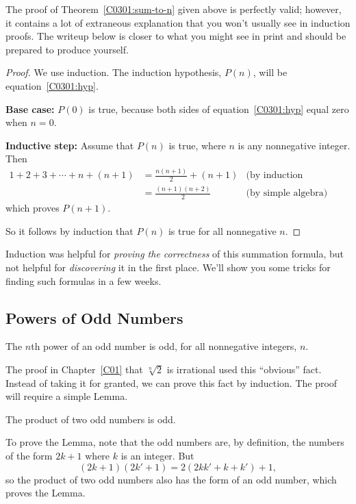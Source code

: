 The proof of Theorem~\ref{C0301:sum-to-n} given above is perfectly valid;
however, it contains a lot of extraneous explanation that you won't
usually see in induction proofs.  The writeup below is closer to what
you might see in print and should be prepared to produce yourself.

\begin{proof}
We use induction.  The induction hypothesis, $P(n)$, will be
equation~\eqref{C0301:hyp}.

\textbf{Base case:} $P(0)$ is true, because both sides of
equation~\eqref{C0301:hyp} equal zero when $n=0$.

\textbf{Inductive step:} Assume that $P(n)$ is true, where
$n$ is any nonnegative integer.  Then
\begin{align*}
1 + 2 + 3 + \cdots + n + (n+1)
    & = \frac{n(n+1)}{2} + (n+1) & \text{(by induction hypothesis)}\\
    & = \frac{(n+1)(n+2)}{2}  & \text{(by simple algebra)}
\end{align*}
which proves $P(n+1)$.

So it follows by induction that $P(n)$ is true for all nonnegative $n$.
\end{proof}

Induction was helpful for \textit{proving the correctness} of this
summation formula, but not helpful for \textit{discovering} it in the
first place.  We'll show you some tricks for finding such formulas in a
few weeks.

\iffalse
\subsection{Powers of Odd Numbers}

\begin{fact*}
The $n$th power of an odd number is odd, for all nonnegative integers, $n$.
\end{fact*}
The proof in Chapter~\ref{C01} that $\sqrt[n]{2}$ is irrational used this 
``obvious'' fact.  Instead of taking it for granted, we can prove this fact
by induction.
The proof will require a simple Lemma.
\begin{lemma*}
The product of two odd numbers is odd.
\end{lemma*}
To prove the Lemma, note that the odd numbers are, by definition, the
numbers of the form $2k+1$ where $k$ is an integer.  But
\[
(2k+1)(2k'+1) = 2(2kk' + k + k')+1,
\]
so the product of two odd numbers also has the form of an odd number,
which proves the Lemma.

